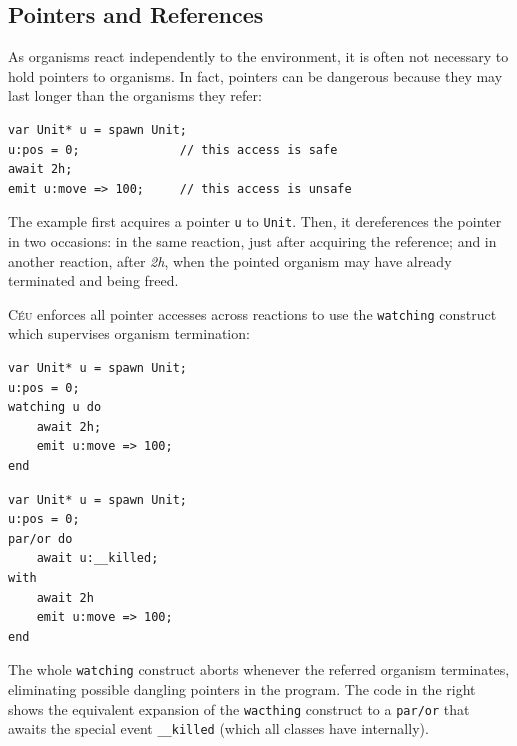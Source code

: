 \documentclass{acm_proc_article-sp}
\newcommand{\CEU}{\textsc{C\'{e}u}\xspace}
\newcommand{\code}[1] {{\small{\texttt{#1}}}}
\newcommand{\1}{\;}
\newcommand{\2}{\;\;}
\newcommand{\3}{\;\;\;}
\newcommand{\5}{\;\;\;\;\;}
\begin{document}
\subsection{Pointers and References}
\label{sec.orgs.refs}

As organisms react independently to the environment, it is often not necessary 
to hold pointers to organisms.
%
In fact, pointers can be dangerous because they may last longer than the 
organisms they refer:

\begin{lstlisting}
var Unit* u = spawn Unit;
u:pos = 0;              // this access is safe
await 2h;
emit u:move => 100;     // this access is unsafe
\end{lstlisting}

The example first acquires a pointer \code{u} to \code{Unit}.
Then, it dereferences the pointer in two occasions:
in the same reaction, just after acquiring the reference;
and in another reaction, after \emph{2h}, when the pointed organism may have 
already terminated and being freed.

\CEU enforces all pointer accesses across reactions to use the \code{watching} 
construct which supervises organism termination:

\begin{minipage}[t]{0.48\linewidth}
\begin{lstlisting}
var Unit* u = spawn Unit;
u:pos = 0;
watching u do
    await 2h;
    emit u:move => 100;
end
\end{lstlisting}
\end{minipage}
%
\begin{minipage}[t]{0.48\linewidth}
\begin{lstlisting}
var Unit* u = spawn Unit;
u:pos = 0;
par/or do
    await u:__killed;
with
    await 2h
    emit u:move => 100;
end
\end{lstlisting}
\end{minipage}

The whole \code{watching} construct aborts whenever the referred organism 
terminates, eliminating possible dangling pointers in the program.
%
The code in the right shows the equivalent expansion of the \code{wacthing} 
construct to a \code{par/or} that awaits the special event \code{\_\_killed} 
(which all classes have internally).
\end{document}
